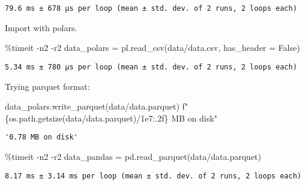 \documentclass[
  letterpaper,
  DIV=11,
  numbers=noendperiod]{scrartcl}
\newenvironment{Shaded}{\begin{snugshade}}{\end{snugshade}}
\newcommand{\FloatTok}[1]{\textcolor[rgb]{0.68,0.00,0.00}{#1}}
\newcommand{\NormalTok}[1]{\textcolor[rgb]{0.00,0.23,0.31}{#1}}
\newcommand{\OperatorTok}[1]{\textcolor[rgb]{0.37,0.37,0.37}{#1}}
\newcommand{\SpecialCharTok}[1]{\textcolor[rgb]{0.37,0.37,0.37}{#1}}
\newcommand{\SpecialStringTok}[1]{\textcolor[rgb]{0.13,0.47,0.30}{#1}}
\newcommand{\StringTok}[1]{\textcolor[rgb]{0.13,0.47,0.30}{#1}}
\newcommand{\VariableTok}[1]{\textcolor[rgb]{0.07,0.07,0.07}{#1}}
\begin{document}
\begin{verbatim}
79.6 ms ± 678 µs per loop (mean ± std. dev. of 2 runs, 2 loops each)
\end{verbatim}

Import with polars.

\begin{Shaded}
\begin{Highlighting}[]
\OperatorTok{\%}\NormalTok{timeit }\OperatorTok{{-}}\NormalTok{n2 }\OperatorTok{{-}}\NormalTok{r2 data\_polars }\OperatorTok{=}\NormalTok{ pl.read\_csv(}\StringTok{\textquotesingle{}data/data.csv\textquotesingle{}}\NormalTok{, has\_header }\OperatorTok{=} \VariableTok{False}\NormalTok{)}
\end{Highlighting}
\end{Shaded}

\begin{verbatim}
5.34 ms ± 780 µs per loop (mean ± std. dev. of 2 runs, 2 loops each)
\end{verbatim}

Trying parquet format:

\begin{Shaded}
\begin{Highlighting}[]
\NormalTok{data\_polars.write\_parquet(}\StringTok{\textquotesingle{}data/data.parquet\textquotesingle{}}\NormalTok{)}
\SpecialStringTok{f"}\SpecialCharTok{\{}\NormalTok{os}\SpecialCharTok{.}\NormalTok{path}\SpecialCharTok{.}\NormalTok{getsize(}\StringTok{\textquotesingle{}data/data.parquet\textquotesingle{}}\NormalTok{)}\OperatorTok{/}\FloatTok{1e7}\SpecialCharTok{:.2f\}}\SpecialStringTok{ MB on disk"}
\end{Highlighting}
\end{Shaded}

\begin{verbatim}
'0.78 MB on disk'
\end{verbatim}

\begin{Shaded}
\begin{Highlighting}[]
\OperatorTok{\%}\NormalTok{timeit }\OperatorTok{{-}}\NormalTok{n2 }\OperatorTok{{-}}\NormalTok{r2 data\_pandas }\OperatorTok{=}\NormalTok{ pd.read\_parquet(}\StringTok{\textquotesingle{}data/data.parquet\textquotesingle{}}\NormalTok{)}
\end{Highlighting}
\end{Shaded}

\begin{verbatim}
8.17 ms ± 3.14 ms per loop (mean ± std. dev. of 2 runs, 2 loops each)
\end{verbatim}
\end{document}
